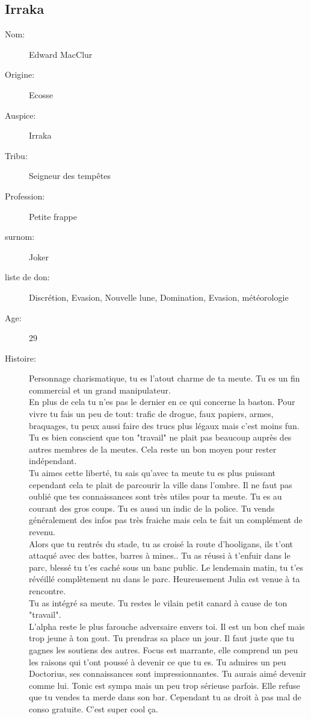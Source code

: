 \documentclass[oneside,12pt]{book}
\begin{document}
\begin{flushleft}
\section{Irraka}
\begin{description}
\item[Nom:]{Edward MacClur}
\item[Origine:]{Ecosse}
\item[Auspice:]{Irraka}
\item[Tribu:]{Seigneur des tempêtes}
\item[Profession:]{Petite frappe}
\item[surnom:]{Joker}
\item[liste de don:]{Discrétion, Evasion, Nouvelle lune, Domination, Evasion, météorologie}
\item[Age:]{29}
\item[Histoire:]{
Personnage charismatique, tu es l'atout charme de ta meute. Tu es un fin commercial et un grand manipulateur. \\ 
En plus de cela tu n'es pas le dernier en ce qui concerne
la baston. 
Pour vivre tu fais un peu de tout: trafic de drogue, faux papiers, armes, braquages, tu peux aussi faire des trucs plus légaux mais c'est moins fun.\\
Tu es bien conscient que ton "travail" ne plait pas beaucoup auprès des autres membres de la meutes. Cela reste un bon moyen pour rester indépendant.\\
Tu aimes cette liberté, tu sais qu'avec ta meute tu es plus puissant cependant cela te plait de parcourir la ville dans l'ombre. Il ne faut pas oublié que tes connaissances sont très utiles pour ta meute. Tu es au courant des gros coups. Tu es aussi un indic de la police. Tu vends généralement des infos pas très fraiche mais cela te fait un complément de revenu. \\
Alors que tu rentrés du stade, tu as croisé la route d'hooligans, ils t'ont attaqué avec des battes, barres à mines.. Tu as réussi à t'enfuir dans le parc, blessé tu t'es caché sous un banc public. Le lendemain matin, tu t'es révéillé complètement nu dans le parc. Heureusement Julia est venue à ta rencontre.\\
Tu as intégré sa meute. Tu restes le vilain petit canard à cause de ton "travail".\\

L'alpha reste le plus farouche adversaire envers toi. Il est un bon chef mais trop jeune à ton gout. Tu prendras sa place un jour. Il faut juste que tu gagnes les soutiens des autres. 
Focus est marrante, elle comprend un peu les raisons qui t'ont poussé à devenir ce que tu es.
Tu admires un peu Doctorius, ses connaissances sont impressionnantes. Tu aurais aimé devenir comme lui. 
Tonic est sympa mais un peu trop sérieuse parfois. Elle refuse que tu vendes ta merde dans son bar. Cependant tu as droit à pas mal de conso gratuite. C'est super cool ça.  


}
\end{description}
\end{flushleft}
\end{document}

